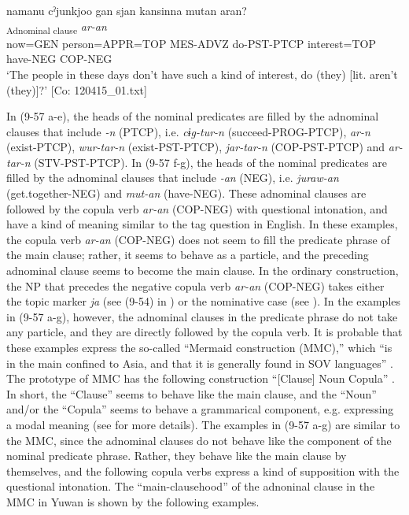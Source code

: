 \ex  %
     \glll namanu  cˀjunkjoo  gan  sjan  {\textbar}kansin{\textbar}na  mutan  aran?\\
      [\textit{nama=nu}  \textit{cˀju=nkja=ja}  \textit{ga-n}  \textit{sɨr-tar-n} \textit{kansin=ja}  \textit{mut-an}]\textsubscript{Adnominal clause}  \textit{ar-an}\\
      now=GEN  person=APPR=TOP  MES-ADVZ  do-PST-PTCP  interest=TOP  have-NEG  COP-NEG\\      
      \glt ‘The people in these days don’t have such a kind of interest, do (they) [lit. aren’t (they)]?’     [Co: 120415\_01.txt]
    \z
\z

In (9-57 a-e), the heads of the nominal predicates are filled by the adnominal clauses that include \textit{-n} (PTCP), i.e. \textit{cɨg-tur-n} (succeed-PROG-PTCP), \textit{ar-n} (exist-PTCP), \textit{wur-tar-n} (exist-PST-PTCP), \textit{jar-tar-n} (COP-PST-PTCP) and \textit{ar-tar-n} (STV-PST-PTCP). In (9-57 f-g), the heads of the nominal predicates are filled by the adnominal clauses that include \textit{-an} (NEG), i.e. \textit{juraw-an} (get.together-NEG) and \textit{mut-an} (have-NEG). These adnominal clauses are followed by the copula verb \textit{ar-an} (COP-NEG) with questional intonation, and have a kind of meaning similar to the tag question in English. In these examples, the copula verb \textit{ar-an} (COP-NEG) does not seem to fill the predicate phrase of the main clause; rather, it seems to behave as a particle, and the preceding adnominal clause seems to become the main clause. In the ordinary construction, the NP that precedes the negative copula verb \textit{ar-an} (COP-NEG) takes either the topic marker \textit{ja} (see (9-54) in ) or the nominative case (see ). In the examples in (9-57 a-g), however, the adnominal clauses in the predicate phrase do not take any particle, and they are directly followed by the copula verb. It is probable that these examples express the so-called “Mermaid construction (MMC),” which “is in the main confined to Asia, and that it is generally found in SOV languages” \citep[25]{Tsunoda2013}. The prototype of MMC has the following construction “[Clause] Noun Copula” \citep[16]{Tsunoda2013}. In short, the “Clause” seems to behave like the main clause, and the “Noun” and/or the “Copula” seems to behave a grammarical component, e.g. expressing a modal meaning (see \citealt{Tsunoda2013} for more details). The examples in (9-57 a-g) are similar to the MMC, since the adnominal clauses do not behave like the component of the nominal predicate phrase. Rather, they behave like the main clause by themselves, and the following copula verbs express a kind of supposition with the questional intonation. The “main-clausehood” of the adnoninal clause in the MMC in Yuwan is shown by the following examples.

